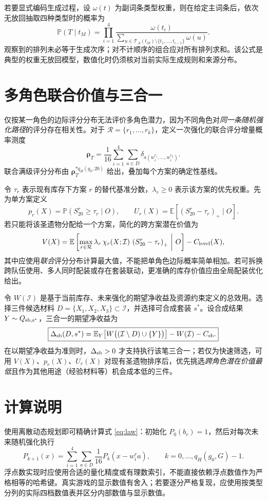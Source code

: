\documentclass[11pt,a4paper]{ctexart}
\newcommand{\E}{\mathbb E}
\newcommand{\Prob}{\mathbb P}
\newcommand{\pos}[1]{\left(#1\right)_+}
\begin{document}
若要显式编码生成过程，设 $\omega(t)$ 为副词条类型权重，则在给定主词条后，依次无放回抽取四种类型时的概率为
\[
\Prob(T\mid t_M)=\prod_{i=1}^4\frac{\omega(t_i)}{\sum_{u\in\mathcal T_A(t_M)\setminus\{t_1,\ldots,t_{i-1}\}}\omega(u)}.
\]
观察到的排列未必等于生成次序；对不计顺序的组合应对所有排列求和。该公式是典型的权重无放回模型，数值化时仍须核对当前实际生成规则和来源分布。

\section{多角色联合价值与三合一}
仅按某一角色的边际评分分布无法评价多角色潜力，因为不同角色对\emph{同一条随机强化路径}的评分存在相关性。对于 $\mathcal R=\{r_1,\ldots,r_k\}$，定义一次强化的联合评分增量概率测度
\[
\boldsymbol\rho_T=\frac1{16}\sum_{i=1}^4\sum_{a\in D}\delta_{a(w_i^{r_1},\ldots,w_i^{r_k})}.
\]
联合满级评分分布由 $\boldsymbol\rho_T^{*q_H(g_0,20)}$ 给出，叠加每个方案的确定性基线。

令 $\tau_r$ 表示现有库存下方案 $r$ 的替代基准分数，$\lambda_r\ge0$ 表示该方案的优先权重。先为单方案定义
\[
p_r(X)=\Prob(S_{20}^r\ge\tau_r\mid O),\qquad
U_r(X)=\E[\pos{S_{20}^r-\tau_r}\mid O].
\]
若只能将该圣遗物分配给一个方案，简化的跨方案潜在价值为
\begin{equation}\label{eq:option}
V(X)=\E\left[\max_{r\in\mathcal R}\lambda_r\,\chi_r(X;\mathcal I)\,\pos{S_{20}^r-\tau_r}\ \middle|\ O\right]-C_{\rm level}(X),
\end{equation}
其中应使用\emph{联合}评分分布计算最大值，不能把单角色边际概率简单相加。若可拆换跨队伍使用、多人同时配装或存在套装联动，更准确的库存价值应由全局配装优化给出。

令 $W(\mathcal I)$ 是基于当前库存、未来强化的期望净收益及资源约束定义的总效用。选择三件候选材料 $D=\{X_1,X_2,X_3\}\subset\mathcal I$，并选择可合成套装 $s^*$。设合成结果 $Y\sim Q_{\rm sb,s^*}$，三合一的期望净收益为
\begin{equation}\label{eq:strongbox}
\boxed{\Delta_{\rm sb}(D,s^*)=\E_{Y}\!\left[W\bigl((\mathcal I\setminus D)\cup\{Y\}\bigr)\right]-W(\mathcal I)-C_{\rm sb}.}
\end{equation}
在以期望净收益为准则时，$\Delta_{\rm sb}>0$ 才支持执行该笔三合一；若仅为快速筛选，可用 $V(X)$、$p_r(X)$、$U_r(X)$ 对现有圣遗物排序后，优先挑选\emph{跨角色潜在价值最低}且作为其他用途（经验材料等）机会成本低的三件。

\section{计算说明}
使用离散动态规划即可精确计算式 \eqref{eq:law}：初始化 $P_0(b_r)=1$，然后对每次未来随机强化执行
\[
P_{k+1}(x)=\sum_{i=1}^4\sum_{a\in D}\frac1{16}P_k(x-w_i^r a),\qquad k=0,\ldots,q_H(g_0,G)-1.
\]
浮点数实现时应使用合适的量化精度或有理数索引，不能直接依赖浮点数值作为严格相等的哈希键。真实游戏的显示数值有舍入；若要逐分严格复现，应使用按类型分列的实际四档数值表并区分内部数值与显示数值。
\end{document}
